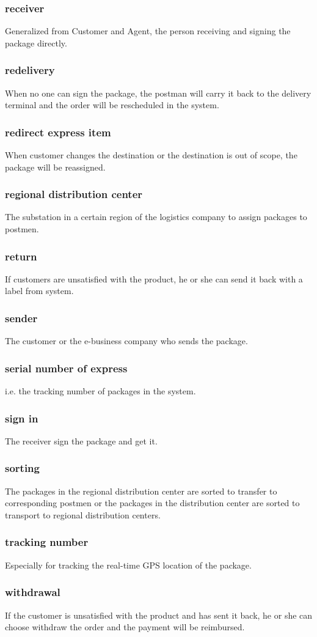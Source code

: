 \documentclass[12pt]{scrreprt}
\begin{document}
\begin{spacing}{0.7}
\subsubsection{receiver}
Generalized from Customer and Agent, the person receiving and signing
the package directly.
\subsubsection{redelivery}
When no one can sign the package, the postman will carry it back to
the delivery terminal and the order will be rescheduled in the system.
\subsubsection{redirect express item}
When customer changes the destination or the destination is out of scope,
the package will be reassigned.
\subsubsection{regional distribution center}
The substation in a certain region of the logistics company to assign
packages to postmen.
\subsubsection{return}
If customers are unsatisfied with the product, he or she can send it back
with a label from system.
\subsubsection{sender}
The customer or the e-business company who sends the package.
\subsubsection{serial number of express}
i.e. the tracking number of packages in the system.
\subsubsection{sign in}
The receiver sign the package and get it.
\subsubsection{sorting}
The packages in the regional distribution center are sorted to transfer to
corresponding postmen or the packages in the distribution center are sorted to
transport to regional distribution centers.
\subsubsection{tracking number}
Especially for tracking the real-time GPS location of the package.
\subsubsection{withdrawal}
If the customer is unsatisfied with the product and has sent it back,
he or she can choose withdraw the order and the payment will be reimbursed.
\end{spacing}
\end{document}
